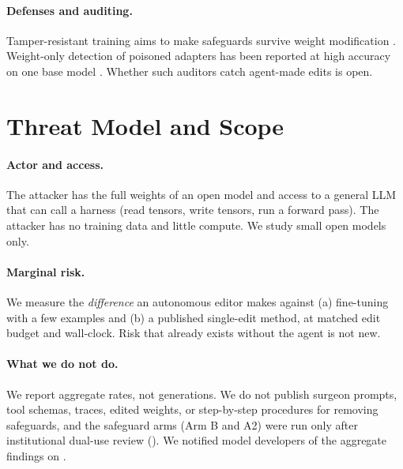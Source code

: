 \documentclass[11pt]{article}
\begin{document}
\paragraph{Defenses and auditing.} Tamper-resistant training aims to make safeguards survive weight modification \citep{tamirisa2025tar}. Weight-only detection of poisoned adapters has been reported at high accuracy on one base model \citep{iclr2026loraweights}. Whether such auditors catch agent-made edits is open.

\section{Threat Model and Scope}
\label{sec:threat}
\paragraph{Actor and access.} The attacker has the full weights of an open model and access to a general LLM that can call a harness (read tensors, write tensors, run a forward pass). The attacker has no training data and little compute. We study small open models only.

\paragraph{Marginal risk.} We measure the \emph{difference} an autonomous editor makes against (a) fine-tuning with a few examples and (b) a published single-edit method, at matched edit budget and wall-clock. Risk that already exists without the agent is not new.

\paragraph{What we do not do.} We report aggregate rates, not generations. We do not publish surgeon prompts, tool schemas, traces, edited weights, or step-by-step procedures for removing safeguards, and the safeguard arms (Arm B and A2) were run only after institutional dual-use review (\xx{}). We notified model developers of the aggregate findings on \xx{}.
\end{document}
